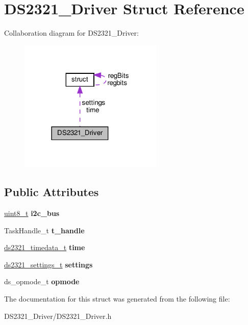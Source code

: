 \hypertarget{structDS2321__Driver}{}\section{D\+S2321\+\_\+\+Driver Struct Reference}
\label{structDS2321__Driver}


Collaboration diagram for D\+S2321\+\_\+\+Driver\+:\nopagebreak
\begin{figure}[H]
\begin{center}
\leavevmode
\includegraphics[width=194pt]{structDS2321__Driver__coll__graph}
\end{center}
\end{figure}
\subsection*{Public Attributes}
\begin{DoxyCompactItemize}
\item 
\mbox{\label{structDS2321__Driver_a88591ce88d3acbd1822720ded9b982b1}} 
\hyperlink{vl53l0x__types_8h_aba7bc1797add20fe3efdf37ced1182c5}{uint8\+\_\+t} {\bfseries i2c\+\_\+bus}
\item 
\mbox{\label{structDS2321__Driver_a6e47c127b0ee78a273733b96bdde78d9}} 
Task\+Handle\+\_\+t {\bfseries t\+\_\+handle}
\item 
\mbox{\label{structDS2321__Driver_a7d91bf719facb99a5781250810a8c07c}} 
\hyperlink{structDS2321__Time}{ds2321\+\_\+timedata\+\_\+t} {\bfseries time}
\item 
\mbox{\label{structDS2321__Driver_a6671e5bc0dbd8ac9f8c248e99f34b432}} 
\hyperlink{structDS2321__Settings}{ds2321\+\_\+settings\+\_\+t} {\bfseries settings}
\item 
\mbox{\label{structDS2321__Driver_adabe3275e24e78a4e0c4b5560294e4b6}} 
ds\+\_\+opmode\+\_\+t {\bfseries opmode}
\end{DoxyCompactItemize}


The documentation for this struct was generated from the following file\+:\begin{DoxyCompactItemize}
\item 
D\+S2321\+\_\+\+Driver/D\+S2321\+\_\+\+Driver.\+h\end{DoxyCompactItemize}

